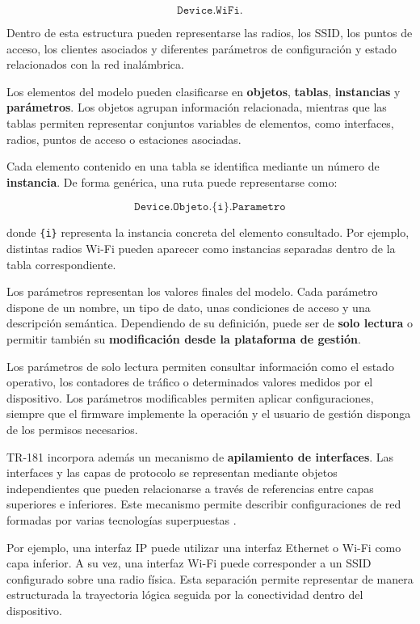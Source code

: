 \[
    \texttt{Device.WiFi.}
\]

Dentro de esta estructura pueden representarse las radios, los SSID, los
puntos de acceso, los clientes asociados y diferentes parámetros de
configuración y estado relacionados con la red inalámbrica.

Los elementos del modelo pueden clasificarse en
\textbf{objetos}, \textbf{tablas}, \textbf{instancias} y
\textbf{parámetros}. Los objetos agrupan información relacionada,
mientras que las tablas permiten representar conjuntos variables de
elementos, como interfaces, radios, puntos de acceso o estaciones
asociadas.

Cada elemento contenido en una tabla se identifica mediante un número de
\textbf{instancia}. De forma genérica, una ruta puede representarse como:

\[
    \texttt{Device.Objeto.\{i\}.Parametro}
\]

donde \texttt{\{i\}} representa la instancia concreta del elemento
consultado. Por ejemplo, distintas radios Wi-Fi pueden aparecer como
instancias separadas dentro de la tabla correspondiente.

Los parámetros representan los valores finales del modelo. Cada
parámetro dispone de un nombre, un tipo de dato, unas condiciones de
acceso y una descripción semántica. Dependiendo de su definición, puede
ser de \textbf{solo lectura} o permitir también su
\textbf{modificación desde la plataforma de gestión}.

Los parámetros de solo lectura permiten consultar información como el
estado operativo, los contadores de tráfico o determinados valores
medidos por el dispositivo. Los parámetros modificables permiten aplicar
configuraciones, siempre que el firmware implemente la operación y el
usuario de gestión disponga de los permisos necesarios.

TR-181 incorpora además un mecanismo de
\textbf{apilamiento de interfaces}. Las interfaces y las capas de
protocolo se representan mediante objetos independientes que pueden
relacionarse a través de referencias entre capas superiores e
inferiores. Este mecanismo permite describir configuraciones de red
formadas por varias tecnologías superpuestas \cite{bbf_tr181}.

Por ejemplo, una interfaz IP puede utilizar una interfaz Ethernet o
Wi-Fi como capa inferior. A su vez, una interfaz Wi-Fi puede
corresponder a un SSID configurado sobre una radio física. Esta
separación permite representar de manera estructurada la trayectoria
lógica seguida por la conectividad dentro del dispositivo.

